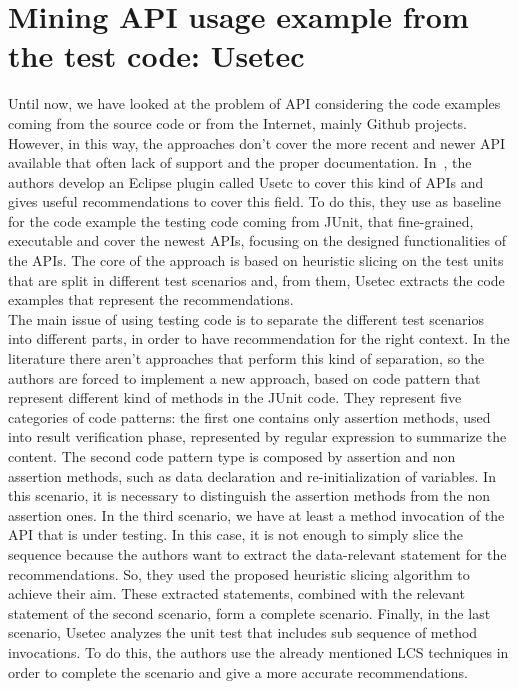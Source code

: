 \section{Mining API usage example from the test code: Usetec}
Until now, we have looked at the problem of API considering the code examples coming from the source code or from the Internet, mainly Github projects. However, in this way, the approaches don't cover the more recent and newer API available that often lack of support and the proper documentation. In~\cite{zhu_mining_2014}, the authors develop an Eclipse plugin called Usetc to cover this kind of APIs and gives useful recommendations to cover this field. To do this, they use as baseline for the code example the testing code coming from JUnit, that fine-grained, executable and cover the newest APIs, focusing on the designed functionalities of the APIs. The core of the approach is based on heuristic slicing on the test units that are split in different test scenarios and, from them, Usetec extracts the code examples that represent the recommendations. \\
The main issue of using testing code is to separate the different test scenarios into different parts, in order to have recommendation for the right context. In the literature there aren't approaches that perform this kind of separation, so the authors are forced to implement a new approach, based on code pattern that represent different kind of methods in the JUnit code. They represent five categories of code patterns: the first one contains only assertion methods, used into result verification phase, represented by regular expression to summarize the content. The second code pattern type is composed by assertion and non assertion methods, such as data declaration and re-initialization of variables. In this scenario, it is necessary to distinguish the assertion methods from the non assertion ones. In the third scenario, we have at least a method invocation of the API that is under testing. In this case, it is not enough to simply slice the sequence because the authors want to extract the data-relevant statement for the recommendations. So, they used the proposed heuristic slicing algorithm to achieve their aim. These extracted statements, combined with the relevant statement of the second scenario, form a complete scenario. Finally, in the last scenario, Usetec analyzes the unit test that includes sub sequence of method invocations. To do this, the authors use the already mentioned LCS techniques in order to complete the scenario and give a more accurate recommendations. \newline
